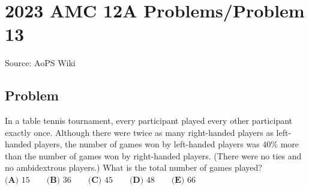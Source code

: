 \documentclass[12pt]{article}
\begin{document}
\section*{{2023 AMC 12A Problems/Problem 13}}
Source: AoPS Wiki

\subsection*{Problem}
In a table tennis tournament, every participant played every other participant exactly once. Although there were twice as many right-handed players as left-handed players, the number of games won by left-handed players was $40\%$ more than the number of games won by right-handed players. (There were no ties and no ambidextrous players.) What is the total number of games played? $\textbf{(A) }15\qquad\textbf{(B) }36\qquad\textbf{(C) }45\qquad\textbf{(D) }48\qquad\textbf{(E) }66$
\end{document}
